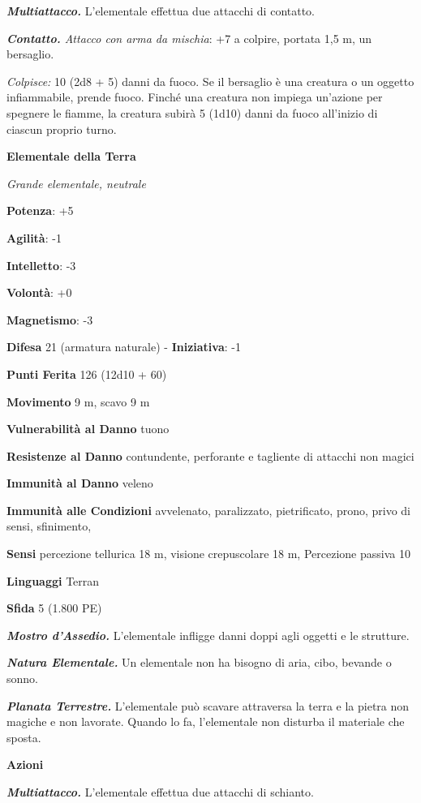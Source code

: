 \begin{multicols}{2}
\emph{\textbf{Multiattacco.}} L'elementale effettua due attacchi di
contatto.

\emph{\textbf{Contatto.} Attacco con arma da mischia}: +7 a colpire,
portata 1,5 m, un bersaglio.

\emph{Colpisce:} 10 (2d8 + 5) danni da fuoco. Se il bersaglio è una
creatura o un oggetto infiammabile, prende fuoco. Finché una creatura
non impiega un'azione per spegnere le fiamme, la creatura subirà 5
(1d10) danni da fuoco all'inizio di ciascun proprio turno.

\textbf{Elementale della Terra}

\emph{Grande elementale, neutrale}

\textbf{Potenza}: +5

\textbf{Agilità}: -1

\textbf{Intelletto}: -3

\textbf{Volontà}: +0

\textbf{Magnetismo}: -3

\textbf{Difesa} 21 (armatura naturale) - \textbf{Iniziativa}: -1

\textbf{Punti Ferita} 126 (12d10 + 60)

\textbf{Movimento} 9 m, scavo 9 m

\textbf{Vulnerabilità al Danno} tuono

\textbf{Resistenze al Danno} contundente, perforante e tagliente di
attacchi non magici

\textbf{Immunità al Danno} veleno

\textbf{Immunità alle Condizioni} avvelenato, paralizzato, pietrificato,
prono, privo di sensi, sfinimento,

\textbf{Sensi} percezione tellurica 18 m, visione crepuscolare 18 m, Percezione
passiva 10

\textbf{Linguaggi} Terran

\textbf{Sfida} 5 (1.800 PE)

\emph{\textbf{Mostro d'Assedio.}} L'elementale infligge danni doppi agli
oggetti e le strutture.

\emph{\textbf{Natura Elementale.}} Un elementale non ha bisogno di aria,
cibo, bevande o sonno.

\emph{\textbf{Planata Terrestre.}} L'elementale può scavare attraversa
la terra e la pietra non magiche e non lavorate. Quando lo fa,
l'elementale non disturba il materiale che sposta.

\textbf{Azioni}

\emph{\textbf{Multiattacco.}} L'elementale effettua due attacchi di
schianto.


\end{multicols}
